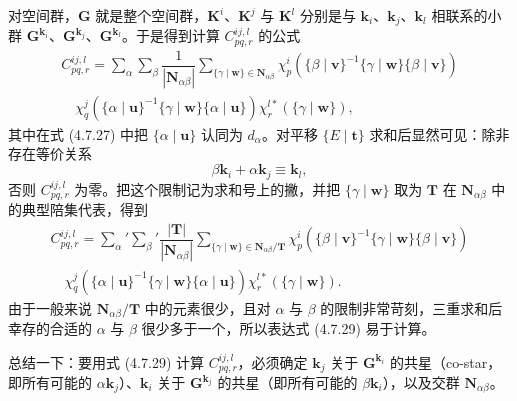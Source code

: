 对空间群，$\mathbf{G}$ 就是整个空间群，$\mathbf{K}^{i}$、$\mathbf{K}^{j}$ 与 $\mathbf{K}^{l}$ 分别是与 $\mathbf{k}_{i}$、$\mathbf{k}_{j}$、$\mathbf{k}_{l}$ 相联系的小群 $\mathbf{G}^{\mathbf{k}_{i}}$、$\mathbf{G}^{\mathbf{k}_{j}}$、$\mathbf{G}^{\mathbf{k}_{l}}$。于是得到计算 $C^{ij, l}_{pq, r}$ 的公式
\begin{equation*}
\begin{array}{l}
C^{ij, l}_{pq, r} = \sum_{\alpha}\sum_{\beta}\dfrac{1}{|\mathbf{N}_{\alpha\beta}|}\sum_{\{\gamma \mid \mathbf{w}\} \in \mathbf{N}_{\alpha\beta}}\chi^{i}_{p}\left(\{\beta \mid \mathbf{v}\}^{-1}\{\gamma \mid \mathbf{w}\}\{\beta \mid \mathbf{v}\}\right)\\
\quad \chi^{j}_{q}\left(\{\alpha \mid \mathbf{u}\}^{-1}\{\gamma \mid \mathbf{w}\}\{\alpha \mid \mathbf{u}\}\right)\chi^{l*}_{r}\left(\{\gamma \mid \mathbf{w}\}\right),
\end{array}
\tag{4.7.27}
\end{equation*}
其中在式 (4.7.27) 中把 $\{\alpha \mid \mathbf{u}\}$ 认同为 $d_{\alpha}$。对平移 $\{E \mid \mathbf{t}\}$ 求和后显然可见：除非存在等价关系
\begin{equation*}
\beta\mathbf{k}_{i} + \alpha\mathbf{k}_{j} \equiv \mathbf{k}_{l},
\tag{4.7.28}
\end{equation*}
否则 $C^{ij, l}_{pq, r}$ 为零。把这个限制记为求和号上的撇，并把 $\{\gamma \mid \mathbf{w}\}$ 取为 $\mathbf{T}$ 在 $\mathbf{N}_{\alpha\beta}$ 中的典型陪集代表，得到
\begin{equation*}
\begin{array}{l}
C^{ij, l}_{pq, r} = \sum_{\alpha}'\sum_{\beta}'\dfrac{|\mathbf{T}|}{|\mathbf{N}_{\alpha\beta}|}\sum_{\{\gamma \mid \mathbf{w}\} \in \mathbf{N}_{\alpha\beta}/\mathbf{T}}\chi^{i}_{p}\left(\{\beta \mid \mathbf{v}\}^{-1}\{\gamma \mid \mathbf{w}\}\{\beta \mid \mathbf{v}\}\right)\\
\quad \chi^{j}_{q}\left(\{\alpha \mid \mathbf{u}\}^{-1}\{\gamma \mid \mathbf{w}\}\{\alpha \mid \mathbf{u}\}\right)\chi^{l*}_{r}\left(\{\gamma \mid \mathbf{w}\}\right).
\end{array}
\tag{4.7.29}
\end{equation*}
由于一般来说 $\mathbf{N}_{\alpha\beta}/\mathbf{T}$ 中的元素很少，且对 $\alpha$ 与 $\beta$ 的限制非常苛刻，三重求和后幸存的合适的 $\alpha$ 与 $\beta$ 很少多于一个，所以表达式 (4.7.29) 易于计算。

总结一下：要用式 (4.7.29) 计算 $C^{ij, l}_{pq, r}$，必须确定 $\mathbf{k}_{j}$ 关于 $\mathbf{G}^{\mathbf{k}_{i}}$ 的共星（co-star，即所有可能的 $\alpha\mathbf{k}_{j}$）、$\mathbf{k}_{i}$ 关于 $\mathbf{G}^{\mathbf{k}_{j}}$ 的共星（即所有可能的 $\beta\mathbf{k}_{i}$），以及交群 $\mathbf{N}_{\alpha\beta}$。

